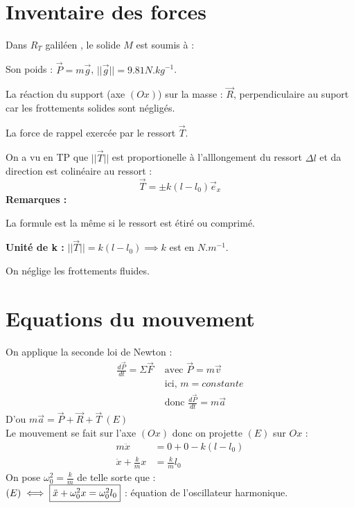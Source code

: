 \documentclass[12pt,twoside,a4paper]{article}
\author{MPSI 2}
\begin{document}
	\maketitle\ \\
	\section{Inventaire des forces}
		Dans $R_T$ galil\'een	, le solide $M$ est soumis \`a :
		\begin{liste}
			\item Son poids : $\vec{P}=m\vec{g}$, $||\vec{g}||=9.81 N.kg^{-1}$.
			\item La r\'eaction du support (axe $(Ox)$) sur la masse : $\vec{R}$, perpendiculaire au suport car les frottements solides sont n\'eglig\'es.
			\item La force de rappel exerc\'ee par le ressort $\vec{T}$.
		\end{liste}
		On a vu en TP que $||\vec{T}||$ est proportionelle \`a l'alllongement du ressort $\Delta l$ et da direction est colin\'eaire au ressort :
		$$\vec{T}=\pm k(l-l_0)\vec{e}_x$$
		\textbf{Remarques :}
		\begin{liste}
			\item La formule est la m\^eme si le ressort est \'etir\'e ou comprim\'e.
			\item \textbf{Unit\'e de k :} $||\vec{T}||=k(l-l_0)\implies k$ est en $N.m^{-1}$.
			\item On n\'eglige les frottements fluides.
		\end{liste}
	\section{Equations du mouvement}
		On applique la seconde loi de Newton :
		$$\begin{aligned}
			\frac{d\vec{P}}{dt}=\Sigma\vec{F}&\text{ avec }\vec{P}=m\vec{v} \\
											 &\text{ ici, }m=constante \\
											 &\text{ donc }\frac{d\vec{P}}{dt}=m\vec{a}
		\end{aligned}$$
		D'ou $m\vec{a}=\vec{P}+\vec{R}+\vec{T}\ (E)$ \\
		Le mouvement se fait sur l'axe $(Ox)$ donc on projette $(E)$ sur $Ox$ :
	$$\begin{aligned}
		m\ddot x&=0+0-k(l-l_0) \\
		\ddot x+\frac{k}{m}x&=\frac{k}{m}l_0
	\end{aligned}$$
	On pose $\omega_0^2=\frac{k}{m}$ de telle sorte que : \\
	$(E)\iff\fbox{$\ddot x+\omega_0^2x=\omega_0^2l_0$}$ : \'equation de l'oscillateur harmonique.
\end{document}
